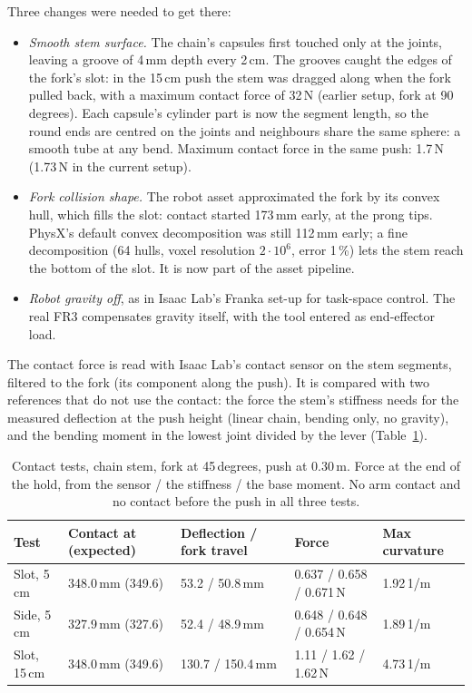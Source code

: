Three changes were needed to get there:
\begin{itemize}
  \item \emph{Smooth stem surface.} The chain's capsules first touched only at the joints, leaving a groove
        of 4\,mm depth every 2\,cm. The grooves caught the edges of the fork's slot: in the 15\,cm push the
        stem was dragged along when the fork pulled back, with a maximum contact force of 32\,N (earlier setup,
        fork at 90\,degrees). Each capsule's cylinder part is now the segment length, so the round ends are
        centred on the joints and neighbours share the same sphere: a smooth tube at any bend. Maximum contact
        force in the same push: 1.7\,N (1.73\,N in the current setup).
  \item \emph{Fork collision shape.} The robot asset approximated the fork by its convex hull, which fills the
        slot: contact started 173\,mm early, at the prong tips. PhysX's default convex decomposition was still
        112\,mm early; a fine decomposition (64 hulls, voxel resolution $2\cdot10^{6}$, error 1\,\%) lets the
        stem reach the bottom of the slot. It is now part of the asset pipeline.
  \item \emph{Robot gravity off}, as in Isaac Lab's Franka set-up for task-space control. The real FR3
        compensates gravity itself, with the tool entered as end-effector load.
\end{itemize}

The contact force is read with Isaac Lab's contact sensor on the stem segments, filtered to the fork (its
component along the push). It is compared with two references that do not use the contact: the force the
stem's stiffness needs for the measured deflection at the push height (linear chain, bending only, no
gravity), and the bending moment in the lowest joint divided by the lever (Table~\ref{tab:contact}).

\begin{table}[h]
  \centering
  \caption{Contact tests, chain stem, fork at 45\,degrees, push at 0.30\,m. Force at the end of the hold, from
           the sensor / the stiffness / the base moment. No arm contact and no contact before the push in all
           three tests.}
  \label{tab:contact}
  \begin{tabular}{lllll}
    \toprule
    Test & Contact at (expected) & Deflection / fork travel & Force & Max curvature \\
    \midrule
    Slot, 5\,cm  & 348.0\,mm (349.6) & 53.2 / 50.8\,mm   & 0.637 / 0.658 / 0.671\,N & 1.92\,1/m \\
    Side, 5\,cm  & 327.9\,mm (327.6) & 52.4 / 48.9\,mm   & 0.648 / 0.648 / 0.654\,N & 1.89\,1/m \\
    Slot, 15\,cm & 348.0\,mm (349.6) & 130.7 / 150.4\,mm & 1.11 / 1.62 / 1.62\,N    & 4.73\,1/m \\
    \bottomrule
  \end{tabular}
\end{table}

